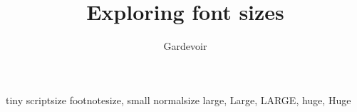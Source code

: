 \documentclass{article}
\begin{document}
	\title{Exploring font sizes}
	\author{Gardevoir}
	\maketitle
	
	\noindent 
	\tiny tiny 
	\scriptsize scriptsize 
	\footnotesize footnotesize,
	\small small
	\normalsize normalsize
	\large large,
	\Large Large,
	\LARGE LARGE,
	\huge huge,
	\Huge Huge
\end{document}
